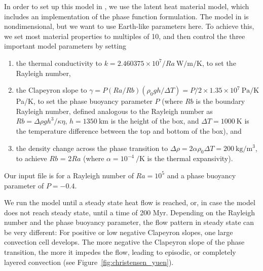 In order to set up this model in \aspect{}, we use the latent heat material model, which includes an implementation of the phase function formulation. 
The model in \cite{CY85} is nondimensional, but we want to use Earth-like parameters here. To achieve this, we set most material properties to multiples of 10, and then control the three important model parameters by setting
\begin{enumerate}
  \item the thermal conductivity to $k = 2.460375 \times 10^7 / Ra~\si{\watt\per\metre\per\kelvin}$, to set the Rayleigh number,
  \item the Clapeyron slope to $\gamma = P (Ra/Rb) (\rho_0 g h/\Delta T) = P/2 \times 1.35 \times 10^7~\si{\pascal\per\kelvin}$ Pa/K, to set the phase buoyancy parameter $P$ (where $Rb$ is the boundary Rayleigh number, defined analogous to the Rayleigh number as $Rb = \Delta \rho g h^3 / \kappa \eta$, $h=1350~\si{\km}$ is the height of the box, and $\Delta T = 1000~\si{\kelvin}$ is the temperature difference between the top and bottom of the box), and 
  \item the density change across the phase transition to $\Delta \rho = 2 \alpha \rho_0 \Delta T = 200~\si{\kg\per\cubic\meter}$, to achieve $Rb$ = 2$Ra$ (where $\alpha = 10^{-4}~\si{\per\kelvin}$ is the thermal expansivity). 
\end{enumerate}   

Our input file is for a Rayleigh number of $Ra = 10^5$ and a phase buoyancy parameter of $P=-0.4$.                                  



We run the model until a steady state heat flow is reached, or, in case the model does not reach steady state, until a time of 200 Myr. 
Depending on the Rayleigh number and the phase buoyancy parameter, the flow pattern in steady state can be very different: For positive or low negative Clapeyron slopes, one large convection cell develops. The more negative the Clapeyron slope of the phase transition, the more it impedes the flow, leading to episodic, or completely layered convection (see Figure~\ref{fig:christensen_yuen}). 

